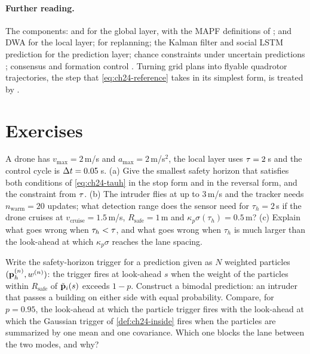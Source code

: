 \paragraph{Further reading.}
The components: \cbs \cite{sharon2015cbs} and \ecbs \cite{barer2014ecbs}
for the global layer, with the MAPF definitions of \textcite{stern2019mapf};
\orca \cite{vandenberg2011orca} and DWA \cite{fox1997dwa} for the local
layer; \dstarlite \cite{koenig2002dstarlite} for replanning; the Kalman
filter \cite{kalman1960new} and social LSTM prediction \cite{alahi2016social}
for the prediction layer; chance constraints under uncertain predictions
\cite{zhu2019chance}; consensus and formation control
\cite{olfatisaber2007consensus}. Turning grid plans into flyable quadrotor
trajectories, the step that \cref{eq:ch24-reference} takes in its simplest
form, is treated by \textcite{honig2018trajectory}.

\section{Exercises}
\label{sec:ch24-exercises}

\begin{exercise}[\difficulty{1}]
\label{exr:ch24-horizon}
A drone has $v_{\max} = 2$\,m/s and $a_{\max} = 2$\,m/s$^2$, the local layer
uses $\tau = 2$\,s and the control cycle is $\Delta t = 0.05$\,s. (a) Give the
smallest safety horizon that satisfies both conditions of
\cref{eq:ch24-tauh} in the stop form and in the reversal form, and the
constraint from $\tau$. (b) The intruder flies at up to $3$\,m/s and the
tracker needs $n_{\mathrm{warm}} = 20$ updates; what detection range does the
sensor need for $\tau_h = 2$\,s if the drone cruises at
$v_{\mathrm{cruise}} = 1.5$\,m/s, $R_{\mathrm{safe}} = 1$\,m and
$\kappa_p\sigma(\tau_h) = 0.5$\,m? (c) Explain what goes wrong when
$\tau_h < \tau$, and what goes wrong when $\tau_h$ is much larger than the
look-ahead at which $\kappa_p\sigma$ reaches the lane spacing.
\end{exercise}

\begin{exercise}[\difficulty{2}]
\label{exr:ch24-particles}
Write the safety-horizon trigger for a prediction given as $N$ weighted
particles $(\mathbf{p}^{(n)}_h, w^{(n)})$: the trigger fires at look-ahead $s$ when
the weight of the particles within $R_{\mathrm{safe}}$ of $\tilde{\mathbf{p}}_i(s)$
exceeds $1 - p$. Construct a bimodal prediction: an intruder that passes a
building on either side with equal probability. Compare, for $p = 0.95$,
the look-ahead at which the particle trigger fires with the look-ahead at
which the Gaussian trigger of \cref{def:ch24-inside} fires when the
particles are summarized by one mean and one covariance. Which one blocks
the lane between the two modes, and why?
\end{exercise}

